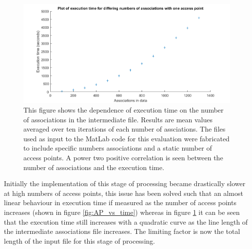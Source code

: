 \begin{figure}[h]
    \centering
    \includegraphics[width=\textwidth]{time_vs_lines.png}
    \caption{This figure shows the dependence of execution time on the number of associations in the intermediate file. Results are mean values averaged over ten iterations of each number of assciations. The files used as input to the MatLab code for this evaluation were fabricated to include specific numbers associations and a static number of access points. A power two positive correlation is seen between the number of associations and the execution time.}
    \label{fig:lines_vs_time}
\end{figure}

Initially the implementation of this stage of processing became drastically slower at high numbers of access points, this issue has been solved such that an almost linear behaviour in execution time if measured as the number of access points increases (shown in figure \ref{fig:AP_vs_time}) whereas in figure \ref{fig:lines_vs_time} it can be seen that the execution time still increases with a quadratic curve as the line length of the intermediate associations file increases. The limiting factor is now the total length of the input file for this stage of processing.

